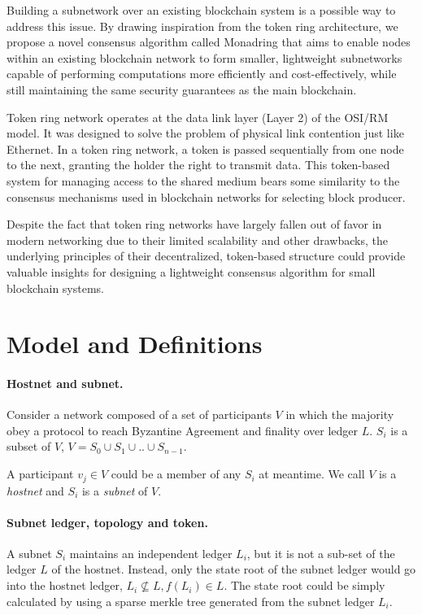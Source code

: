 \documentclass[11pt]{article}
\begin{document}
Building a subnetwork over an existing blockchain system is a possible way to address this issue. By drawing inspiration from the token ring architecture, we propose a novel consensus algorithm called Monadring that aims to enable nodes within an existing blockchain network to form smaller, lightweight subnetworks capable of performing computations more efficiently and cost-effectively, while still maintaining the same security guarantees as the main blockchain.

Token ring network operates at the data link layer (Layer 2) of the OSI/RM model. It was designed to solve the problem of physical link contention just like Ethernet. In a token ring network, a token is passed sequentially from one node to the next, granting the holder the right to transmit data. This token-based system for managing access to the shared medium bears some similarity to the consensus mechanisms used in blockchain networks for selecting block producer.

Despite the fact that token ring networks have largely fallen out of favor in modern networking due to their limited scalability and other drawbacks, the underlying principles of their decentralized, token-based structure could provide valuable insights for designing a lightweight consensus algorithm for small blockchain systems.

\section{Model and Definitions}
\paragraph{Hostnet and subnet.}

Consider a network composed of a set of participants $V$ in which the majority obey a protocol to reach Byzantine Agreement and finality\cite{grandpa} over ledger $L$. $S_{i}$ is a subset of $V$, \( V = S_{0} \cup S_{1} \cup .. \cup S_{n-1}  \).

A participant \( v_{j} \in V \) could be a member of any $S_{i}$ at meantime. We call $V$ is a \textit{hostnet} and $S_{i}$ is a \textit{subnet} of $V$.

\paragraph{Subnet ledger, topology and token.}
A subnet $S_{i}$ maintains an independent ledger $L_{i}$, but it is not a sub-set of the ledger $L$ of the hostnet. Instead, only the state root of the subnet ledger would go into the hostnet ledger, \( L_{i} \nsubseteq L, f(L_{i}) \in L \). The state root could be simply calculated by using a sparse merkle tree generated from the subnet ledger $L_{i}$.
\end{document}
